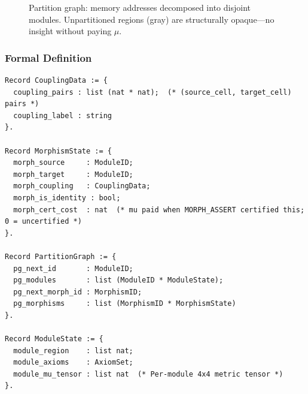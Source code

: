\begin{figure}[H]
\centering
{}
\caption{Partition graph: memory addresses decomposed into disjoint modules. Unpartitioned regions (gray) are structurally opaque---no insight without paying $\mu$.}
\label{fig:partition-graph}
\end{figure}

\subsubsection{Formal Definition}

\begin{lstlisting}
Record CouplingData := {
  coupling_pairs : list (nat * nat);  (* (source_cell, target_cell) pairs *)
  coupling_label : string
}.

Record MorphismState := {
  morph_source     : ModuleID;
  morph_target     : ModuleID;
  morph_coupling   : CouplingData;
  morph_is_identity : bool;
  morph_cert_cost  : nat  (* mu paid when MORPH_ASSERT certified this; 0 = uncertified *)
}.

Record PartitionGraph := {
  pg_next_id       : ModuleID;
  pg_modules       : list (ModuleID * ModuleState);
  pg_next_morph_id : MorphismID;
  pg_morphisms     : list (MorphismID * MorphismState)
}.

Record ModuleState := {
  module_region    : list nat;
  module_axioms    : AxiomSet;
  module_mu_tensor : list nat  (* Per-module 4x4 metric tensor *)
}.
\end{lstlisting}

